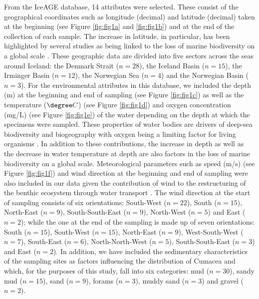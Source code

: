 From the IceAGE database, 14 attributes were selected. These consist of the geographical coordinates such as longitude (decimal) and latitude (decimal) taken at the beginning (see Figure \ref{fig:fig1a} and \ref{fig:fig1b}) and at the end of the collection of each sample. The increase in latitude, in particular, has been highlighted by several studies as being linked to the loss of marine biodiversity on a global scale \citep{rex_global-scale_1993, lambshead_latitudinal_2000, gage_diversity_2004}. These geographic data are divided into five sectors across the seas around Iceland: the Denmark Strait (\( n=28 \)), the Iceland Basin (\( n=15 \)), the Irminger Basin (\( n=12 \)), the Norwegian Sea (\( n=4 \)) and the Norwegian Basin (\( n=3 \)). For the environmental attributes in this database, we included the depth (m) at the beginning and end of sampling (see Figure \ref{fig:fig1c}) as well as the temperature (\( \degree C \)) (see Figure \ref{fig:fig1d}) and oxygen concentration (mg/L) (see Figure \ref{fig:fig1e}) of the water depending on the depth at which the specimens were sampled. These properties of water bodies are drivers of deep-sea biodiversity and biogeography with oxygen being a limiting factor for living organisms \citep{keeling_ocean_2010}. In addition to these contributions, the increase in depth \citep{rex_global_2006, roberts_cold-water_2009, costello_marine_2017} as well as the decrease in water temperature at depth \citep{lambshead_latitudinal_2000} are also factors in the loss of marine biodiversity on a global scale. Meteorological parameters such as speed (m/s) (see Figure \ref{fig:fig1f}) and wind direction at the beginning and end of sampling were also included in our data given the contribution of wind to the restructuring of the benthic ecosystem through water transport \citep{saeedi_environmental_2022, waga_recent_2020}. The wind direction at the start of sampling consists of six orientations: South-West (\( n=22 \)), South (\( n=15 \)), North-East (\( n=9 \)), South-South-East (\( n=9 \)), North-West (\( n=5 \)) and East (\( n=2 \)); while the one at the end of the sampling is made up of seven orientations: South (\( n=15 \)), South-West (\( n=15 \)), North-East (\( n=9 \)), West-South-West (\( n=7 \)), South-East (\( n=6 \)), North-North-West (\( n=5 \)), South-South-East (\( n=3 \)) and East (\( n=2 \)). In addition, we have included the sedimentary characteristics of the sampling sites as factors influencing the distribution of Cumacea \citep{uhlir_adding_2021} and which, for the purposes of this study, fall into six categories: mud (\( n=30 \)), sandy mud (\( n=15 \)), sand (\( n=9 \)), forams (\( n=3 \)), muddy sand (\( n=3 \)) and gravel (\( n=2 \)).

